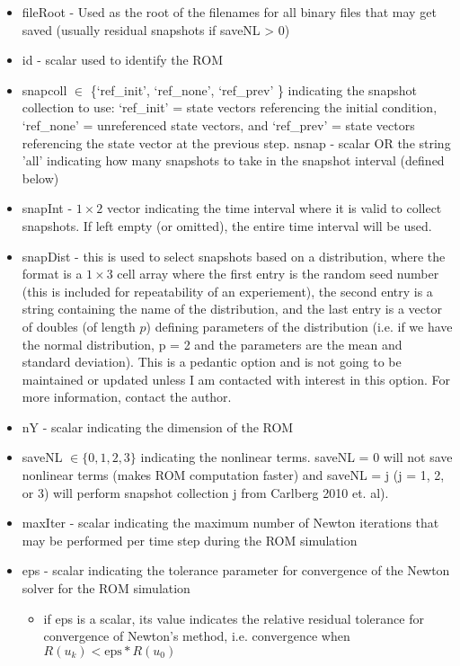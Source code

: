 \documentclass[notitlepage]{report}
\begin{document}
\begin{itemize}
  \item fileRoot - Used as the root of the filenames for all binary files that may get saved (usually residual snapshots if saveNL > 0)
    \item id - scalar used to identify the ROM
    \item snapcoll $\in$ \{`ref\_init',  `ref\_none', `ref\_prev' \} indicating the snapshot collection to use: `ref\_init' = state vectors referencing the initial condition, `ref\_none' = unreferenced state vectors, and `ref\_prev' = state vectors referencing the state vector at the previous step. 
    nsnap - scalar OR the string 'all' indicating how many snapshots to take in the snapshot interval (defined below)
    \item snapInt - $1 \times 2$ vector indicating the time interval where it is valid to collect snapshots.  If left empty (or omitted), the entire time interval will be used.
    \item snapDist - this is used to select snapshots based on a distribution, where the format is a $1 \times 3$ cell array where the first entry is the random seed number (this is included for repeatability of an experiement), the second entry is a string containing the name of the distribution, and the last entry is a vector of doubles (of length $p$) defining parameters of the distribution (i.e. if we have the normal distribution, p = 2 and the parameters are the mean and standard deviation).  This is a pedantic option and is not going to be maintained or updated unless I am contacted with interest in this option.  For more information, contact the author.
    \item nY - scalar indicating the dimension of the ROM
    \item saveNL $\in \{0, 1, 2, 3\}$ indicating the nonlinear terms.  saveNL = 0 will not save nonlinear terms (makes ROM computation faster) and saveNL = j (j = 1, 2, or 3) will perform snapshot collection j from Carlberg 2010 et. al).
  \item maxIter - scalar indicating the maximum number of Newton iterations that may be performed per time step during the ROM simulation
  \item eps - scalar indicating the tolerance parameter for convergence of the Newton solver for the ROM simulation
        \begin{itemize}
        \item if eps is a scalar, its value indicates the relative residual tolerance for convergence of Newton's method, i.e. convergence when $R(u_k) < \text{eps}*R(u_0)$

\end{itemize}
\end{itemize}
\end{document}
